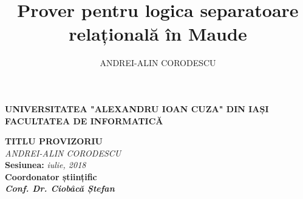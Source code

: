 \documentclass[12pt,a4paper]{article}
\author{ANDREI-ALIN CORODESCU}
\title{Prover pentru logica separatoare relațională în Maude}
\begin{document}
\begin{titlepage}
\begin{center}
\textbf{
UNIVERSITATEA "ALEXANDRU IOAN CUZA" DIN IAȘI
}
\\
\textbf{FACULTATEA DE INFORMATICĂ}
\end{center}
   \vspace{50mm}
\begin{center}
	\Large\textbf {TITLU PROVIZORIU}\\
	\vspace{30mm}
	\large\textit {ANDREI-ALIN CORODESCU}
	\\
	\vspace{20mm}
	\textbf{Sesiunea: }\textit{iulie, 2018}\\
	\vspace{30mm}
	\textbf{Coordonator științific}\\
	\textbf{\textit{Conf. Dr. Ciobâcă Ștefan}}
	\vspace{30mm}
\end{center}

\end{titlepage}
\end{document}
